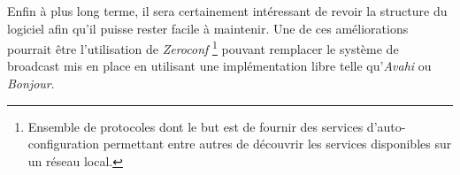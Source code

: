 Enfin à plus long terme, il sera certainement intéressant de revoir la
structure du logiciel afin qu'il puisse rester facile à maintenir.
Une de ces améliorations pourrait être l'utilisation de \emph{Zeroconf}
\footnote{Ensemble de protocoles dont le but est de fournir des services
d'auto-configuration permettant entre autres de découvrir les services
disponibles sur un réseau local.} pouvant remplacer le système de
broadcast mis en place en utilisant une implémentation libre telle
qu'\emph{Avahi}\cite{avahi} ou \emph{Bonjour}\cite{bonjour}.
